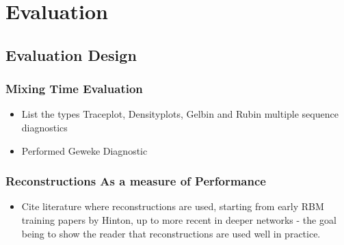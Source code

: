 \chapter{Evaluation}

\section{Evaluation Design}


\subsection{Mixing Time Evaluation}
  \begin{itemize}
    \item List the types Traceplot, Densityplots, Gelbin and Rubin multiple sequence diagnostics
    \item Performed Geweke Diagnostic
  \end{itemize}
\subsection{Reconstructions As a measure of Performance}

 \begin{itemize}
   \item Cite literature where reconstructions are used, starting from early RBM training papers by Hinton, up to more recent in deeper networks - the goal being to show the reader that reconstructions are used well in practice.
 \end{itemize}

